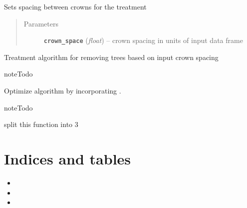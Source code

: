 \documentclass[letterpaper,10pt,english]{sphinxmanual}
\begin{document}
\begin{fulllineitems}
\begin{fulllineitems}
\end{fulllineitems}


\begin{fulllineitems}
\label{SpaceCrowns:intervene.SpaceCrowns.set_crown_space}
Sets spacing between crowns for the treatment
\begin{quote}\begin{description}
\item[{Parameters}] \leavevmode
\textbf{\texttt{crown\_space}} (\emph{float}) -- crown spacing in units of input data frame

\end{description}\end{quote}

\end{fulllineitems}


\begin{fulllineitems}
\label{SpaceCrowns:intervene.SpaceCrowns.treat}
Treatment algorithm for removing trees based on input crown spacing

\begin{notice}{note}{Todo}

Optimize algorithm by incorporating .
\end{notice}

\begin{notice}{note}{Todo}

split this function into 3
\end{notice}

\end{fulllineitems}


\begin{fulllineitems}
\label{SpaceCrowns:intervene.SpaceCrowns.treatment_collection}
\end{fulllineitems}


\end{fulllineitems}



\chapter{Indices and tables}
\label{index:indices-and-tables}\begin{itemize}
\item {} 

\item {} 

\item {} 

\end{itemize}
\end{document}

